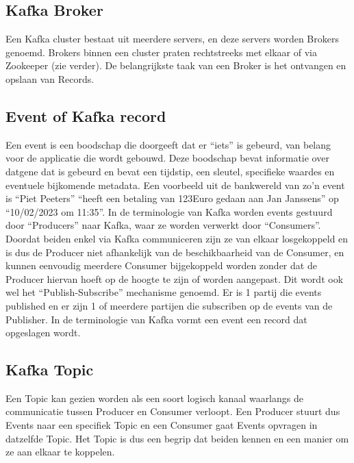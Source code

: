 \subsection{Kafka Broker}
Een Kafka cluster bestaat uit meerdere servers, en deze servers worden Brokers genoemd. Brokers binnen een cluster praten rechtstreeks met elkaar of via Zookeeper (zie verder).
De belangrijkste taak van een Broker is het ontvangen en opslaan van Records.\textcite{GitBook2023}

\subsection{Event of Kafka record}
Een event is een boodschap die doorgeeft dat er ``iets'' is gebeurd, van belang voor de applicatie die wordt gebouwd. Deze boodschap bevat informatie over datgene dat is gebeurd en bevat een tijdstip, een sleutel, specifieke waardes en eventuele bijkomende metadata. Een voorbeeld uit de bankwereld van zo'n event is ``Piet Peeters'' ``heeft een betaling van 123Euro gedaan aan Jan Janssens'' op ``10/02/2023 om 11:35''.
In de terminologie van Kafka worden events gestuurd door ``Producers'' naar Kafka, waar ze worden verwerkt door ``Consumers''. Doordat beiden enkel via Kafka communiceren zijn ze van elkaar losgekoppeld en is dus de Producer niet afhankelijk van de beschikbaarheid van de Consumer, en kunnen eenvoudig meerdere Consumer bijgekoppeld worden zonder dat de Producer hiervan hoeft op de hoogte te zijn of worden aangepast. Dit wordt ook wel het ``Publish-Subscribe'' mechanisme genoemd. Er is 1 partij die events published en er zijn 1 of meerdere partijen die subscriben op de events van de Publisher.
In de terminologie van Kafka vormt een event een record dat opgeslagen wordt.
\textcite{Kafka2023}


\subsection{Kafka Topic}
Een Topic kan gezien worden als een soort logisch kanaal waarlangs de communicatie tussen Producer en Consumer verloopt. Een Producer stuurt dus Events naar een specifiek Topic en een Consumer gaat Events opvragen in datzelfde Topic. Het Topic is dus een begrip dat beiden kennen en een manier om ze aan elkaar te koppelen.
\textcite{Harbour2023}


